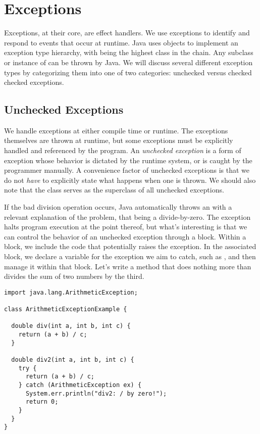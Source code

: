 \section{Exceptions}

Exceptions, at their core, are effect handlers. We use exceptions to identify and respond to events that occur at runtime. Java uses objects to implement an exception type hierarchy, with  being the highest class in the chain. Any subclass or instance of  can be thrown by Java. We will discuss several different exception types by categorizing them into one of two categories: unchecked versus checked checked exceptions.

\subsection{Unchecked Exceptions}
We handle exceptions at either compile time or runtime. The exceptions themselves are thrown at runtime, but some exceptions must be explicitly handled and referenced by the program. An \emph{unchecked exception} is a form of exception whose behavior is dictated by the runtime system, or is caught by the programmer manually. A convenience factor of unchecked exceptions is that we do not \emph{have} to explicitly state what happens when one is thrown. We should also note that the  class serves as the superclass of all unchecked exceptions.

If the bad division operation occurs, Java automatically throws an  with a relevant explanation of the problem, that being a divide-by-zero. 
The exception halts program execution at the point thereof, but what's interesting is that we can control the behavior of an unchecked exception through a  block. 
Within a  block, we include the code that potentially raises the exception. 
In the associated  block, we declare a variable for the exception we aim to catch, such as , and then manage it within that block.
Let's write a method that does nothing more than divides the sum of two numbers by the third.

\enlargethispage{-3\baselineskip}
\begin{lstlisting}[language=MyJava]
import java.lang.ArithmeticException;

class ArithmeticExceptionExample {
  
  double div(int a, int b, int c) {
    return (a + b) / c;
  }

  double div2(int a, int b, int c) {
    try {
      return (a + b) / c;
    } catch (ArithmeticException ex) {
      System.err.println("div2: / by zero!");
      return 0;
    }
  }
} 
\end{lstlisting}

